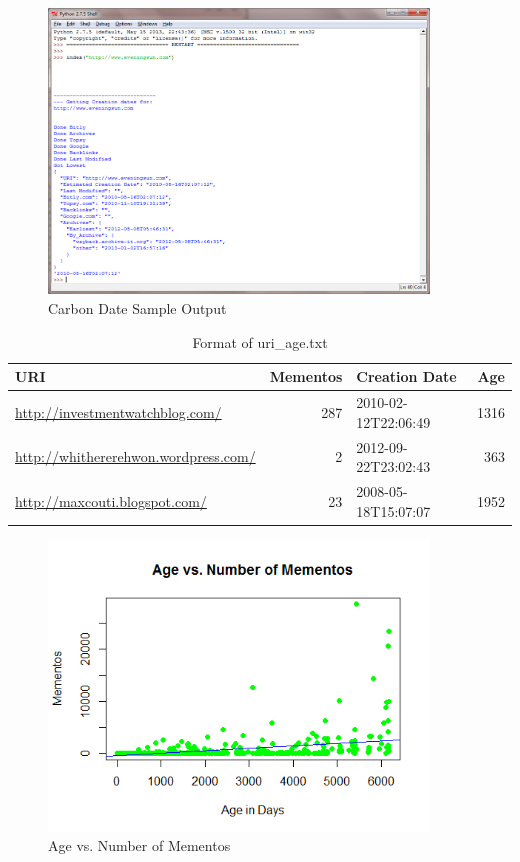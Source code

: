\documentclass[letterpaper,11pt]{report}
\begin{document}
\begin{savenotes}
\begin{figure}[htbp]
	\centering
		\includegraphics[width=0.90\textwidth]{CarbonDateSampleOutput.png}
	\caption{Carbon Date Sample Output}
	\label{fig:CarbonDateSampleOutput}
\end{figure}

\begin{table}[htbp]
\centering
    \begin{tabularx}{\textwidth}{X|r|l|r}
    \hline
    URI                                        & Mementos & Creation Date       & Age  \\ \hline
    \url{http://investmentwatchblog.com/}      & 287      & 2010-02-12T22:06:49 & 1316 \\ \hline
    \url{http://whithererehwon.wordpress.com/} & 2        & 2012-09-22T23:02:43 & 363  \\ \hline
    \url{http://maxcouti.blogspot.com/       } & 23       & 2008-05-18T15:07:07 & 1952 \\ \hline
    \end{tabularx}
    \caption{Format of uri\_age.txt}
		\label{tab:uriage}
\end{table}

\begin{figure}[htbp]
	\centering
		\includegraphics[width=0.90\textwidth]{scatterplot.png}
	\caption{Age vs. Number of Mementos}
	\label{fig:scatterplot}
\end{figure}

\end{savenotes}
\end{document}
